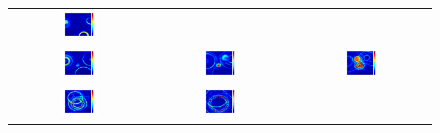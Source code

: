 \begin{figure}[H]
\begin{tabular}{ccc}
	\includegraphics[width=0.3\textwidth]{linea_timerev/figuras/timereversal/ev1/tr129.png}\\
	\includegraphics[width=0.3\textwidth]{linea_timerev/figuras/timereversal/ev1/tr130.png}&
	\includegraphics[width=0.3\textwidth]{linea_timerev/figuras/timereversal/ev1/tr131.png}&
	\includegraphics[width=0.3\textwidth]{linea_timerev/figuras/timereversal/ev1/tr132.png}\\
	\includegraphics[width=0.3\textwidth]{linea_timerev/figuras/timereversal/ev1/tr133.png}&
	\includegraphics[width=0.3\textwidth]{linea_timerev/figuras/timereversal/ev1/tr134.png}&

\end{tabular}
\end{figure}
